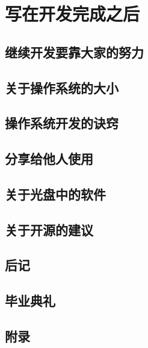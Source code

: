 ﻿\chapter{	写在开发完成之后	}
\section{	继续开发要靠大家的努力	}
\section{	关于操作系统的大小	}
\section{	操作系统开发的诀窍	}
\section{	分享给他人使用	}
\section{	关于光盘中的软件	}
\section{	关于开源的建议	}
\section{	后记	}
\section{	毕业典礼	}
\section{	附录	}
